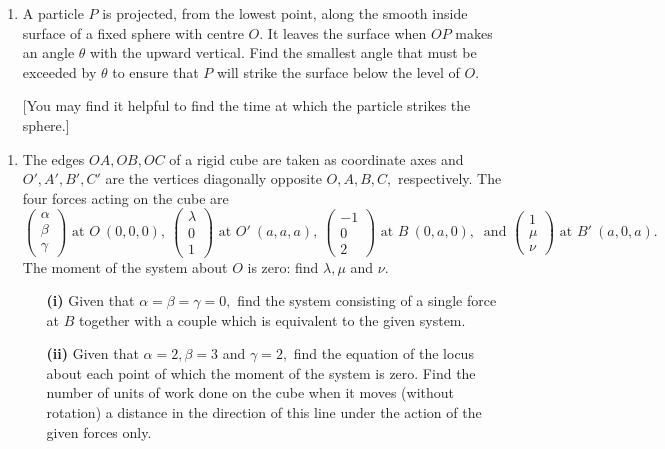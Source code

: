 \documentclass[a4, 11pt]{report}
\newlength{\qspace}
\newcounter{qnumber}
\newenvironment{question}%
 {\vspace{\qspace}
  \begin{enumerate}[\bfseries 1\quad][10]%
    \setcounter{enumi}{\value{qnumber}}%
    \item%
 }
{
  \end{enumerate}
  \filbreak
  \stepcounter{qnumber}
 }
\begin{document}

\begin{question}
A particle $P$ is projected, from the lowest point, along the smooth
inside surface of a fixed sphere with centre $O$. It leaves the surface
when $OP$ makes an angle $\theta$ with the upward vertical. Find
the smallest angle that must be exceeded by $\theta$ to ensure that
$P$ will strike the surface below the level of $O$. 


{[}You may find it helpful to find the time at which the particle
strikes the sphere.{]} 
\end{question}
	
\begin{question}
	The edges $OA,OB,OC$ of a rigid cube are taken as coordinate axes
	and $O',A',B',C'$ are the vertices diagonally opposite $O,A,B,C,$
	respectively. The four forces acting on the cube are 
	\[
	\begin{pmatrix}\alpha\\
	\beta\\
	\gamma
	\end{pmatrix}\mbox{ at }O\ (0,0,0),\ \begin{pmatrix}\lambda\\
	0\\
	1
	\end{pmatrix}\mbox{ at }O'\ (a,a,a),\ \begin{pmatrix}-1\\
	0\\
	2
	\end{pmatrix}\mbox{ at }B\ (0,a,0),\ \mbox{ and }\begin{pmatrix}1\\
	\mu\\
	\nu
	\end{pmatrix}\mbox{ at }B'\ (a,0,a).
	\]
	The moment of the system about $O$ is zero: find $\lambda,\mu$ and
	$\nu$.
\begin{itemize}
\setlength{\itemsep}{3mm}
\item[\bf (i)]  Given that $\alpha=\beta=\gamma=0,$ find the system consisting of
a single force at $B$ together with a couple which is equivalent
to the given system. 
\item[\bf (ii)] Given that $\alpha=2,\beta=3$ and $\gamma=2,$ find the equation
of the locus about each point of which the moment of the system is
zero. Find the number of units of work done on the cube when it moves
(without rotation) a distance in the direction of this line under
the action of the given forces only.  
\end{itemize}

\end{question}
	
\end{document}
